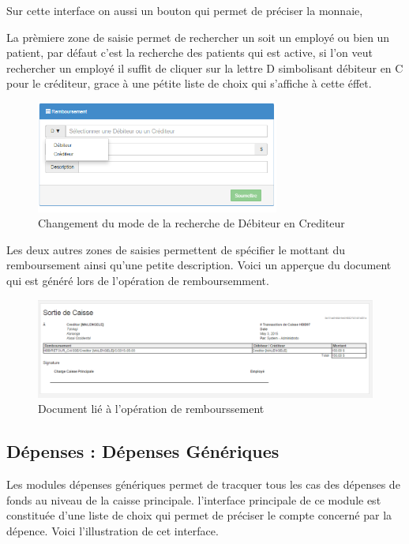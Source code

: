 \documentclass[12pt,a4paper]{report}
\begin{document}
Sur cette interface on aussi un bouton qui permet de préciser la monnaie, 

La prèmiere zone de saisie permet de rechercher un soit un employé ou bien un patient, par défaut c'est la recherche des patients qui est active, si l'on veut rechercher un employé il suffit de cliquer sur la lettre D simbolisant débiteur en C pour le créditeur, grace à une pétite liste de choix qui s'affiche à cette éffet.


\begin{figure}[h]
\begin{center}
\includegraphics[width=8cm]{pic/SelectDebCredRembor.png}
\end{center}
\caption{Changement du mode de la recherche de Débiteur en Crediteur}
\label{Changement du mode de la recherche de Débiteur en Crediteur}
\end{figure}

\newpage
Les deux autres zones de saisies permettent de spécifier le mottant du remboursement ainsi qu'une petite description.  
Voici un apperçue du document qui est généré lors de l'opération de remboursemment. 

\begin{figure}[h]
\begin{center}
\includegraphics[width=14cm]{pic/SortieCaisse.png}
\end{center}
\caption{Document lié à l'opération de rembourssement}
\label{Document lié à l'opération de rembourssement}
\end{figure}


\subsection{Dépenses : Dépenses Génériques}
Les modules dépenses génériques permet de tracquer tous les cas des dépenses de fonds au niveau de la caisse principale. l'interface principale de ce module est constituée d'une liste de choix qui permet de préciser le compte concerné par la dépence.
Voici l'illustration de cet interface.
\end{document}
